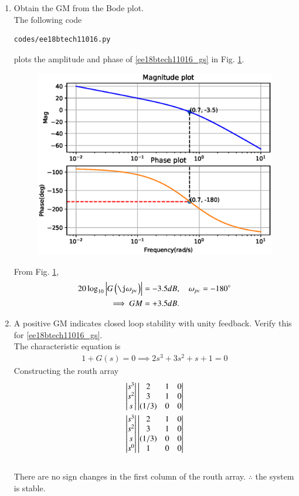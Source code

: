 \begin{enumerate}[label=\thesection.\arabic*.,ref=\thesection.\theenumi]
\item Obtain the GM from the Bode plot.
\\
\solution The following code 
\begin{lstlisting}
codes/ee18btech11016.py
\end{lstlisting}
%
plots the amplitude and phase of \eqref{ee18btech11016_gs} in Fig. \ref{fig:ee18btech11016}.
%
\begin{figure}[htp]
	\centering
	\includegraphics[width=\columnwidth]{./figs/ee18btech11016/ee18btech11016.eps}
	\caption{}
	\label{fig:ee18btech11016}
\end{figure}
From Fig. \ref{fig:ee18btech11016},
\begin{align}
20\log_{10}\abs{G\brak{\j\omega_{pc}}} &= -3.5dB,  \quad \omega_{pc} = -180\degree
\\
\implies  GM &= +3.5dB. 
\end{align}
\item A positive GM indicates closed loop stability with unity feedback.  Verify this for \eqref{ee18btech11016_gs}.
\\
\solution 
The characteristic equation is 
\begin{align}
1+G(s)=0 
\implies 2s^3 + 3s^2 + s + 1 = 0 
\end{align}
Constructing the routh array
\begin{align}
\begin{vmatrix}s^3\\s^2\\s\end{vmatrix}
\begin{vmatrix}2 & 1 & 0 \\ 3 & 1 & 0 \\ (1/3) & 0 & 0\end{vmatrix}
\\
\begin{vmatrix}s^3\\s^2\\s\\s^0\end{vmatrix}
\begin{vmatrix}2 & 1 & 0 \\ 3 & 1 & 0 \\ (1/3) & 0 & 0 \\ 1 & 0 & 0\end{vmatrix}
\end{align}\\
%
There are no sign changes in the first column of the routh array. 
$\therefore$ the system is stable.


\end{enumerate}

